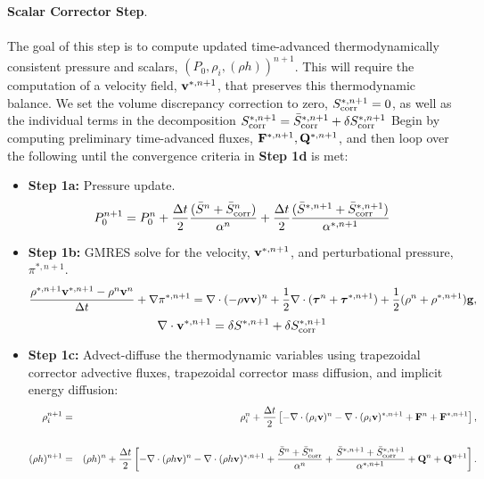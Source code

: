 \documentclass[final]{siamltex}
\def\Fb {{\bf F}}
\def\gb {{\bf g}}
\def\Qb {{\bf Q}}
\def\vb {{\bf v}}
\def\taub   {\boldsymbol{\tau}}
\begin{document}
{\bf Scalar Corrector Step}.\\ \\
The goal of this step is to compute updated time-advanced thermodynamically consistent 
pressure and scalars, $(P_0,\rho_i,(\rho h))^{n+1}$.  This will require the computation
of a velocity field, $\vb^{*,n+1}$, that preserves this thermodynamic balance.
We set the volume discrepancy correction to zero,
$S_{\rm corr}^{*,n+1} = 0$, as well as the individual terms in the decomposition
$S_{\rm corr}^{*,n+1} = \bar{S}_{\rm corr}^{*,n+1} + \delta S_{\rm corr}^{*,n+1}$
Begin by computing preliminary time-advanced fluxes, $\Fb^{*,n+1}, \Qb^{*,n+1}$,
and then loop over the following until the convergence criteria in {\bf Step 1d} is met:\\
\begin{itemize}
\item {\bf Step 1a:} Pressure update.
\begin{equation}
P_0^{n+1} = P_0^n + \frac{\Delta t}{2}\frac{(\bar{S}^n + \bar{S}_{\rm corr}^n)}{\alpha^n} + \frac{\Delta t}{2}\frac{(\bar{S}^{*,n+1} + \bar{S}_{\rm corr}^{*,n+1})}{\alpha^{*,n+1}}
\end{equation}
\item {\bf Step 1b:} GMRES solve for the velocity, $\vb^{*,n+1}$, and perturbational
pressure, $\pi^{*,n+1}$.
\begin{equation}
\frac{\rho^{*,n+1}\vb^{*,n+1} - \rho^n\vb^n}{\Delta t} + \nabla\pi^{*,n+1} = \nabla\cdot(-\rho\vb\vb)^n + \frac{1}{2}\nabla\cdot(\taub^n + \taub^{*,n+1}) + \frac{1}{2}(\rho^n + \rho^{*,n+1})\gb,
\end{equation}
\begin{equation}
\nabla\cdot\vb^{*,n+1} = \delta S^{*,n+1} + \delta S_{\rm corr}^{*,n+1}
\end{equation}
\item {\bf Step 1c:} Advect-diffuse the thermodynamic variables using trapezoidal 
corrector advective fluxes, trapezoidal corrector mass diffusion, and implicit energy 
diffusion:
\begin{eqnarray}
\rho_i^{n+1} &=& \rho_i^n + \frac{\Delta t}{2}\left[-\nabla\cdot(\rho_i\vb)^n -\nabla\cdot(\rho_i\vb)^{*,n+1} + \Fb^n + \Fb^{*,n+1}\right],\nonumber \\
\\
(\rho h)^{n+1} &=& (\rho h)^n + \frac{\Delta t}{2}\left[-\nabla\cdot(\rho h\vb)^n -\nabla\cdot(\rho h\vb)^{*,n+1} + \frac{\bar{S}^n + \bar{S}_{\rm corr}^n}{\alpha^n} + \frac{\bar{S}^{*,n+1}+ \bar{S}_{\rm corr}^{*,n+1}}{\alpha^{*,n+1}} + \Qb^n + \Qb^{n+1}\right].\nonumber\\

\end{eqnarray}
\end{itemize}
\end{document}
